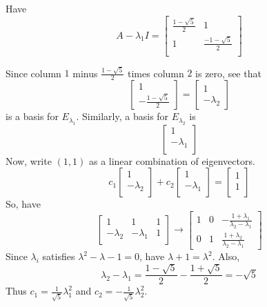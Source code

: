 \documentclass{article}
\begin{document}
\begin{example}
  Have \[
    A - \lambda_1 I =
    \begin{bmatrix}
      \frac{1 - \sqrt{5}}{2} & 1                       \\
      1                      & \frac{-1 - \sqrt{5}}{2} \\
    \end{bmatrix}
  \]

  Since column $1$ minus $\frac{1 - \sqrt{5}}{2}$ times column $2$ is zero, see that \[
    \begin{bmatrix}
      1 \\
      -\frac{1 - \sqrt{5}}{2}
    \end{bmatrix} =
    \begin{bmatrix}
      1 \\
      -\lambda_2
    \end{bmatrix}
  \] is a basis for $E_{\lambda_1}$. Similarly, a basis for $E_{\lambda_2}$ is \[
    \begin{bmatrix}
      1          \\
      -\lambda_1 \\
    \end{bmatrix}
  \]
  Now, write $(1, 1)$ as a linear combination of eigenvectors.
  \[
    c_1
    \begin{bmatrix}
      1 \\-\lambda_2\\
    \end{bmatrix} + c_2
    \begin{bmatrix}
      1 \\-\lambda_1\\
    \end{bmatrix} =
    \begin{bmatrix}
      1 \\1\\
    \end{bmatrix}
  \] So, have \[
    \begin{bmatrix}
      1          & 1          & 1 \\
      -\lambda_2 & -\lambda_1 & 1 \\
    \end{bmatrix} \to
    \begin{bmatrix}
      1 & 0 & -\frac{1 + \lambda_1}{\lambda_2 - \lambda_1} \\
      0 & 1 & \frac{1 + \lambda_2}{\lambda_2 - \lambda_1}
    \end{bmatrix}
  \]
  Since $\lambda_i$ satisfies $\lambda^2 - \lambda - 1 = 0$, have $\lambda + 1 = \lambda^2$. Also, \[
    \lambda_2 - \lambda_1 = \frac{1 - \sqrt{5}}{2} - \frac{1 + \sqrt{5}}{2} = -\sqrt{5}
  \] Thus $c_1 = \frac{1}{\sqrt{5}}\lambda_1^2$ and $c_2 = -\frac{1}{\sqrt{5}}\lambda_2^2$.


\end{example}
\end{document}
